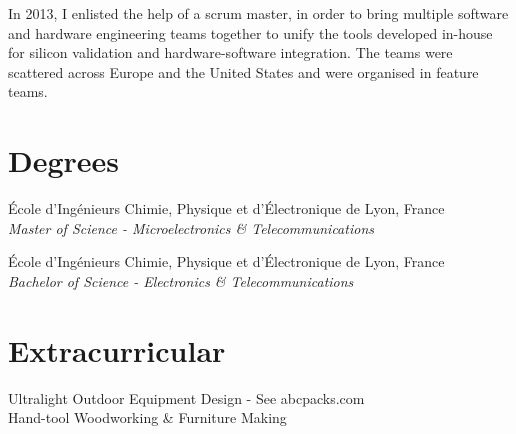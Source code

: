 \documentclass[10pt,a4paper]{moderncv}
\newcommand*{\educationentry}[4][2mm]{
    {#3, #4}\\
    {\itshape #2}
    \par\addvspace{#1}
}
\begin{document}
    \vspace{2.0mm}

    In 2013, I enlisted the help of a scrum master, in order to bring multiple software and hardware engineering teams together to unify the tools developed in-house for silicon validation and hardware-software integration. The teams were scattered across Europe and the United States and were organised in feature teams. 

\noindent
\begin{minipage}[t]{0.60\textwidth}
    
    \section{Degrees}

    \educationentry{Master of Science - Microelectronics \& Telecommunications}{École d'Ingénieurs Chimie, Physique et d'Électronique de Lyon}{France}
    \par

    \vspace{3.0mm}

    \educationentry{Bachelor of Science - Electronics \& Telecommunications}{École d'Ingénieurs Chimie, Physique et d'Électronique de Lyon}{France}

\end{minipage}
\hfill
\begin{minipage}[t]{0.35\textwidth}

    \section{Extracurricular}

    Ultralight Outdoor Equipment Design - See abcpacks.com
    \\
    Hand-tool Woodworking \& Furniture Making

\end{minipage}
\end{document}
